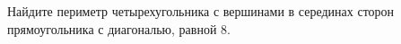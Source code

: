 	\begin{ex}
	\begin{condition}
		Найдите периметр четырехугольника с вершинами в серединах сторон прямоугольника с диагональю, равной \( 8 \).
	\end{condition}
\end{ex}